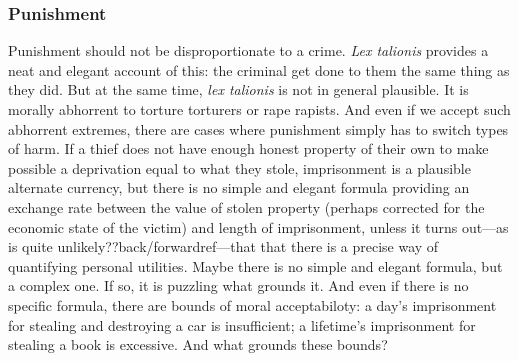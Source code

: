 \subsubsection{Punishment}
Punishment should not be disproportionate to a crime. \textit{Lex talionis} provides a neat and elegant account
of this: the criminal get done to them the same thing as they did. But at the same time, \textit{lex talionis} is 
not in general plausible. It is morally abhorrent to torture torturers or rape rapists. And even if we accept such
abhorrent extremes, there are cases where punishment simply has to switch types of harm. If a thief does not have enough
honest property of their own to make possible a deprivation equal to what they stole, imprisonment is a plausible alternate currency,
but there is no simple and elegant formula providing an exchange rate between the value of stolen property (perhaps
corrected for the economic state of the victim) and length of imprisonment, unless it turns out---as is quite unlikely??back/forwardref---that 
that there is a precise way of quantifying personal utilities. Maybe there is no simple and elegant formula, but a 
complex one. If so, it is puzzling what grounds it. And even if there is no specific formula, there are bounds 
of moral acceptabiloty: a day's imprisonment for stealing and destroying a car is insufficient; 
a lifetime's imprisonment for stealing a book is excessive. And what grounds these bounds?

